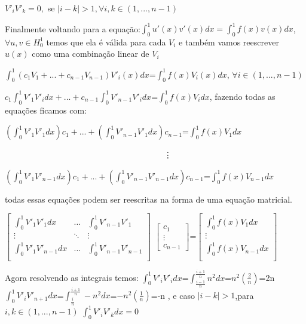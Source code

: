 \documentclass[a4paper]{article}
\begin{document}
\(V'_iV'_k=0,\) se \(|i-k|>1,\forall i,k \in (1,...,n-1)\)

Finalmente voltando para a equação:\(\int_{0}^{1}u'(x)v'(x)dx=\int_{0}^{1}f(x)v(x)dx\),   \(\forall u,v\in H_{0}^{1} \) temos que ela é válida para cada \(V_i\) e também vamos reescrever \(u(x)\) como uma combinação linear de \(V_i\)

\(\int_{0}^{1}(c_1V_1+...+c_{n-1}V_{n-1})V'_i(x)dx\)=\(\int_{0}^{1}f(x)V_i(x)dx\), \(\forall i \in (1,...,n-1)\) 

\(c_1 \int_{0}^{1}V'_1 V'_idx+ ... + c_{n-1}\int_{0}^{1}V'_{n-1}V'_idx\)=\(\int_{0}^{1}f(x)V_idx\), fazendo todas as equações ficamos com:

\((\int_{0}^{1}V'_1V'_1dx)c_1+...+(\int_{0}^{1}V'_{n-1}V'_1dx)c_{n-1}\)=\(\int_{0}^{1}f(x)V_1dx\) 

\ \ \ \ \ \ \ \ \ \ \ \ \ \ \ \ \ \ \ \ \ \ \ \ \ \ \ \ \ \ \ \ \ \ \ \ \ \   \vdots
 
 \((\int_{0}^{1}V'_1V'_{n-1}dx)c_1+...+(\int_{0}^{1}V'_{n-1}V'_{n-1}dx)c_{n-1}\)=\(\int_{0}^{1}f(x)V_{n-1}dx\) 
 
 todas essas equações podem ser reescritas na forma de uma equação matricial.
 
 \( \begin{bmatrix}
  \int_{0}^{1}V'_1V'_1dx &  \dots &  \int_{0}^{1}V'_{n-1}V'_{1} \\
   \vdots & \ddots & \vdots \\
   \int_{0}^{1}V'_1V'_{n-1}dx & \dots & \int_{0}^{1}V'_{n-1}V'_{n-1}\\
   \end{bmatrix}\) \(\begin{bmatrix}
   c_1 \\
   \vdots \\
   c_{n-1}
   \end{bmatrix}\)=\(\begin{bmatrix}
   \int_{0}^{1}f(x)V_1dx \\
   \vdots \\
   \int_{0}^{1}f(x)V_{n-1}dx \\
   \end{bmatrix}\)
   
   Agora resolvendo as integrais temos: \(\int_{0}^{1}V'_iV'_idx\)=\(\int_{\frac{i-1}{n}}^{\frac{i+1}{n}}n^{2}dx\)=\(n^{2}(\frac{2}{n})\)=2n \\
  \(\int_{0}^{1}V'_iV'_{n+1}dx\)=\(\int_{\frac{i}{n}}^{\frac{i+1}{n}}-n^{2}dx\)=\(-n^{2}(\frac{1}{n})\)=-n , e caso \(|i-k|>1\),para \(i,k\in (1,...,n-1)\) \(\int_{0}^{1}V'_iV'_kdx=0\) \\
  
\end{document}

